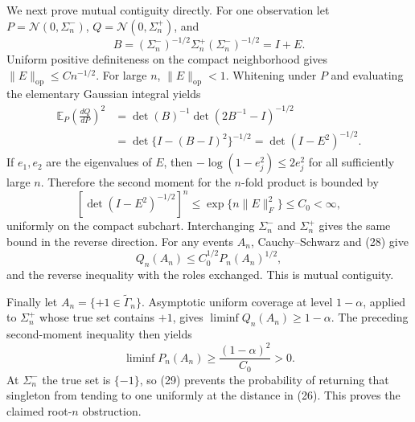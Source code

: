 We next prove mutual contiguity directly.  For one observation let \(P=\mathcal N(0,\Sigma_n^-)\), \(Q=\mathcal N(0,\Sigma_n^+)\), and
\[
 B=(\Sigma_n^-)^{-1/2}\Sigma_n^+(\Sigma_n^-)^{-1/2}=I+E.
\]
Uniform positive definiteness on the compact neighborhood gives \(\lVert E\rVert_{\mathrm{op}}\le Cn^{-1/2}\).  For large \(n\), \(\lVert E\rVert_{\mathrm{op}}<1\).  Whitening under \(P\) and evaluating the elementary Gaussian integral yields
\begin{equation}
 \begin{aligned}
 \mathbb E_P\left(\frac{dQ}{dP}\right)^2
 &=\det(B)^{-1}\det(2B^{-1}-I)^{-1/2}\\
 &=\det\{I-(B-I)^2\}^{-1/2}
 =\det(I-E^2)^{-1/2}.
 \end{aligned}
 \tag{27}
\end{equation}
If \(e_1,e_2\) are the eigenvalues of \(E\), then \(-\log(1-e_j^2)\le2e_j^2\) for all sufficiently large \(n\).  Therefore the second moment for the \(n\)-fold product is bounded by
\[
 \left[\det(I-E^2)^{-1/2}\right]^n
 \le\exp\{n\lVert E\rVert_F^2\}\le C_0<\infty, \tag{28}
\]
uniformly on the compact subchart.  Interchanging \(\Sigma_n^-\) and \(\Sigma_n^+\) gives the same bound in the reverse direction.  For any events \(A_n\), Cauchy--Schwarz and (28) give
\[
 Q_n(A_n)\le C_0^{1/2}P_n(A_n)^{1/2},
 \]
and the reverse inequality with the roles exchanged.  This is mutual contiguity.

Finally let \(A_n=\{+1\in\widetilde\Gamma_n\}\).  Asymptotic uniform coverage at level \(1-\alpha\), applied to \(\Sigma_n^+\) whose true set contains \(+1\), gives \(\liminf Q_n(A_n)\ge1-\alpha\).  The preceding second-moment inequality then yields
\[
 \liminf P_n(A_n)\ge\frac{(1-\alpha)^2}{C_0}>0. \tag{29}
\]
At \(\Sigma_n^-\) the true set is \(\{-1\}\), so (29) prevents the probability of returning that singleton from tending to one uniformly at the distance in (26).  This proves the claimed root-\(n\) obstruction.
